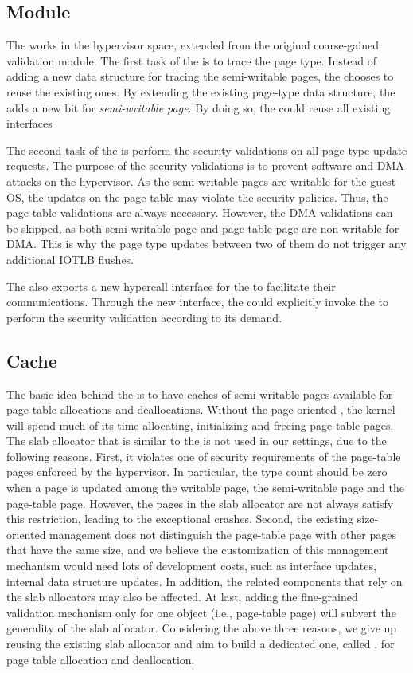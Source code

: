 \subsection{\name Module}\label{sec:module}
The \module works in the hypervisor space, extended from the original coarse-gained validation module.
The first task of the \module is to trace the page type. 
Instead of adding a new data structure for tracing the semi-writable pages, the \module chooses to reuse the existing ones.
By extending the existing page-type data structure, the \module adds a new bit for \emph{semi-writable page}.
By doing so, the \module could reuse all existing interfaces 

The second task of the \module is perform the security validations on all page type update requests.
The purpose of the security validations is to prevent software and DMA attacks on the hypervisor.
As the semi-writable pages are writable for the guest OS, the updates on the page table may violate the security policies. Thus, the page table validations are always necessary.
However, the DMA validations can be skipped, as both semi-writable page and page-table page are non-writable for DMA.
This is why the page type updates between two of them do not trigger any additional IOTLB flushes.

The \module also exports a new hypercall interface for the \cache to facilitate their communications.
Through the new interface, the \cache could explicitly invoke the \module to perform the security validation according to its demand.

\subsection{\name Cache}\label{sec:cache}
The basic idea behind the \cache is to have caches of semi-writable pages available for page table allocations and deallocations.
Without the page oriented \cache, the kernel will spend much of its time allocating, initializing and freeing page-table pages.
The slab allocator that is similar to the \cache is not used in our settings, due to the following reasons.
First, it violates one of security requirements of the page-table pages enforced by the hypervisor.
In particular, the type count should be zero when a page is updated among the writable page, the semi-writable page and the page-table page.
However, the pages in the slab allocator are not always satisfy this restriction, leading to the exceptional crashes.
Second, the existing size-oriented management does not distinguish the page-table page with other pages that have the same size, and we believe the customization of this management mechanism would need lots of development costs, such as interface updates, internal data structure updates.
In addition, the related components that rely on the slab allocators may also be affected.
At last, adding the fine-grained validation mechanism only for one object (i.e., page-table page) will subvert the generality of the slab allocator.
Considering the above three reasons, we give up reusing the existing slab allocator and aim to build a dedicated one, called \cache, for page table allocation and deallocation.

